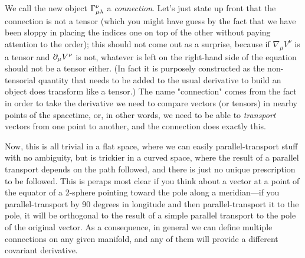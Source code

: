 We call the new object $\Gamma^{\nu}_{\mu\lambda}$ a \emph{connection}. Let's
just state up front that the connection is not a tensor (which you might have guess
by the fact that we have been sloppy in placing the indices one on top of the other
without paying attention to the order); this should not come out as a surprise,
because if $\nabla_\mu V^\nu$ is a tensor and $\partial_{\mu} V^\nu$ is not, whatever
is left on the right-hand side of the equation should not be a tensor either.
(In fact it is purposely constructed as the non-tensorial quantity that needs to
be added to the usual derivative to build an object does transform like a tensor.)
The name "connection" comes from the fact in order to take the derivative we need
to compare vectors (or tensors) in nearby points of the spacetime, or, in other
words, we need to be able to \emph{transport} vectors from one point to another,
and the connection does exactly this.

Now, this is all trivial in a flat space, where we can easily parallel-transport
stuff with no ambiguity, but is trickier in a curved space, where the result of a
parallel transport depends on the path followed, and there is just no unique prescription
to be followed. This is peraps most clear if you think
about a vector at a point of the equator of a 2-sphere pointing toward the pole
along a meridian---if you parallel-transport by 90 degrees in longitude and then
parallel-transport it to the pole, it will be orthogonal to the result of a simple
parallel transport to the pole of the original vector. As a consequence, in general
we can define multiple connections on any given manifold, and any of them will
provide a different covariant derivative.

